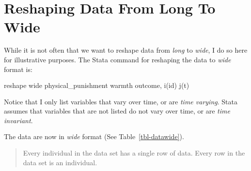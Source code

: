 \documentclass[
  letterpaper,
  DIV=11,
  numbers=noendperiod]{scrreprt}
\newenvironment{Shaded}{\begin{snugshade}}{\end{snugshade}}
\newcommand{\KeywordTok}[1]{\textcolor[rgb]{0.00,0.23,0.31}{#1}}
\newcommand{\NormalTok}[1]{\textcolor[rgb]{0.00,0.23,0.31}{#1}}
\begin{document}
\hypertarget{reshaping-data-from-long-to-wide}{%
\section{Reshaping Data From Long To
Wide}\label{reshaping-data-from-long-to-wide}}

While it is not often that we want to reshape data from \emph{long} to
\emph{wide}, I do so here for illustrative purposes. The Stata command
for reshaping the data to \emph{wide} format is:

\begin{Shaded}
\begin{Highlighting}[]

\KeywordTok{reshape} \KeywordTok{wide}\NormalTok{ physical\_punishment warmth outcome, i(id) j(t)}
\end{Highlighting}
\end{Shaded}

Notice that I only list variables that vary over time, or are \emph{time
varying}. Stata assumes that variables that are not listed do not vary
over time, or are \emph{time invariant}.

The data are now in \emph{wide} format (See Table~\ref{tbl-datawide}).

\begin{quote}
Every individual in the data set has a single row of data. Every row in
the data set is an individual.
\end{quote}
\end{document}

